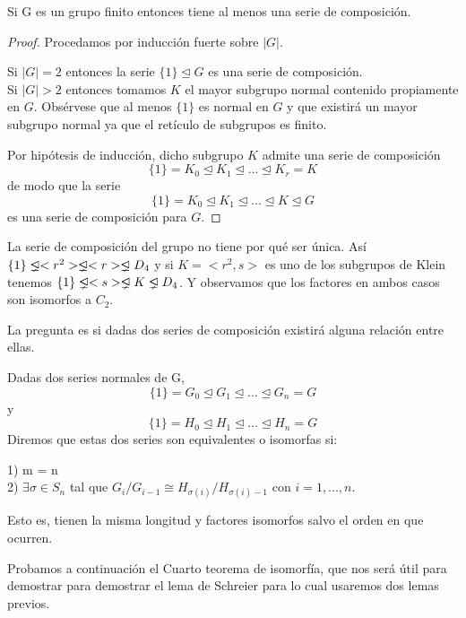 \begin{theorem}
Si G es un grupo finito entonces tiene al menos una serie de composición.
\end{theorem}
\begin{proof}
Procedamos por inducción fuerte sobre $|G|$. 

Si $|G| = 2$ entonces la serie $\{1\} \trianglelefteq G$ es una serie de composición.\\
Si $|G| > 2$ entonces tomamos $K$ el mayor subgrupo normal contenido propiamente en $G$. Obsérvese que al menos $\{1\}$ es normal en $G$ y que existirá un mayor subgrupo normal ya que el retículo de subgrupos es finito. 

Por hipótesis de inducción, dicho subgrupo $K$ admite una serie de composición $$\{1\} = K_0 \trianglelefteq K_1 \trianglelefteq ... \trianglelefteq K_r = K$$ de modo que la serie $$\{1\} = K_0 \trianglelefteq K_1 \trianglelefteq ... \trianglelefteq K \trianglelefteq G$$ es una serie de composición para $G$.
\end{proof}

\begin{example}
La serie de composición del grupo no tiene por qué ser única. Así $\{1\} \propernormal <r^2> \propernormal <r> \propernormal D_4$ y si $K = <r^2,s>$ es uno de los subgrupos de Klein tenemos $\{1\} \propernormal <s> \propernormal K \propernormal D_4$. Y observamos que los factores en ambos casos son isomorfos a $C_2$.
\end{example}

La pregunta es si dadas dos series de composición existirá alguna relación entre ellas.

\begin{definition}
Dadas dos series normales de G, $$\{1\} = G_0 \trianglelefteq G_1 \trianglelefteq ... \trianglelefteq G_n = G$$ y $$\{1\} = H_0 \trianglelefteq H_1 \trianglelefteq ... \trianglelefteq H_n = G$$ Diremos que estas dos series son equivalentes o isomorfas si:

1) m = n\\
2) $\exists \sigma \in S_n$ tal que $G_i/G_{i-1} \cong H_{\sigma(i)}/H_{\sigma(i)-1}$ con $i=1,...,n$. 

Esto es, tienen la misma longitud y factores isomorfos salvo el orden en que ocurren.
\end{definition}

Probamos a continuación el Cuarto teorema de isomorfía, que nos será útil para demostrar para demostrar el lema de Schreier para lo cual usaremos dos lemas previos.

